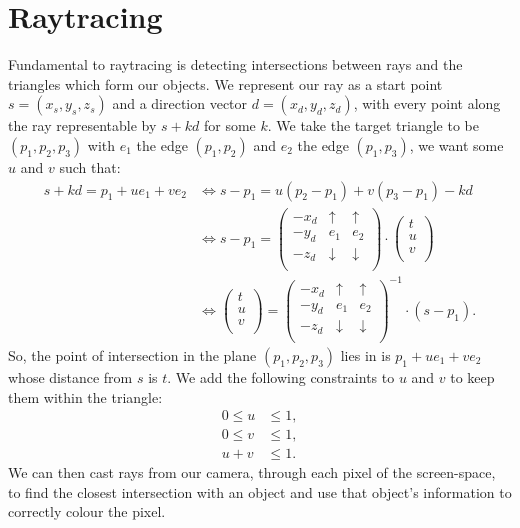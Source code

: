 \section{Raytracing}

Fundamental to raytracing is detecting intersections between rays and the
triangles which form our objects.
We represent our ray as a start point $s = (x_s, y_s, z_s)$ and a direction vector 
$d = (x_d, y_d, z_d)$, with every point along the ray representable 
by $s + kd$ for some $k$. We take the target triangle to be 
$(p_1, p_2, p_3)$ with $e_1$ the edge $(p_1, p_2)$ and
$e_2$ the edge $(p_1, p_3)$, we want some $u$ and $v$ such that: \begin{align*}
    s + kd = p_1 + ue_1 + ve_2
    & \Longleftrightarrow
    s - p_1 = u(p_2 - p_1) + v(p_3 - p_1) - kd \\
    & \Longleftrightarrow
    s - p_1 = \begin{pmatrix}
        -x_d & \uparrow & \uparrow \\
        -y_d & e_1 & e_2 \\
        -z_d & \downarrow & \downarrow \\
    \end{pmatrix} \cdot \begin{pmatrix}
        t \\ u \\ v \\
    \end{pmatrix} \\
    & \Longleftrightarrow
    \begin{pmatrix}
        t \\ u \\ v \\
    \end{pmatrix} = \begin{pmatrix}
        -x_d & \uparrow & \uparrow \\
        -y_d & e_1 & e_2 \\
        -z_d & \downarrow & \downarrow \\
    \end{pmatrix}^{-1} \cdot (s - p_1).
\end{align*} So, the point of intersection in the plane $(p_1, p_2, p_3)$ lies
in is $p_1 + ue_1 + ve_2$ whose distance from $s$ is $t$. We add the following
constraints to $u$ and $v$ to keep them within the triangle: \begin{align*}
    0 \leq u &\leq 1, \\
    0 \leq v &\leq 1, \\
    u + v &\leq 1.
\end{align*} We can then cast rays from our camera, through each pixel of the
screen-space, to find the closest intersection with an object and use that object's
information to correctly colour the pixel.